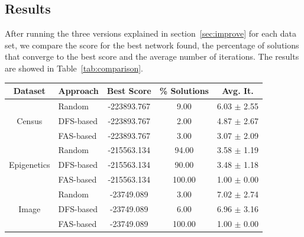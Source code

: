 \subsection{Results}
\label{subsec:results}
	After running the three versions explained in section~\ref{sec:improve} for each data set, we compare the score for the best network found, the percentage of solutions that converge to the best score and the average number of iterations. The results are showed in Table~\ref{tab:comparison}.

	\begin{table}[ h ]
		\centering
		\begin{tabular}{|c|l|c|c|c|}
			\hline
			Dataset & Approach & Best Score & \% Solutions & Avg. It. \\ \hline
			\multirow{3}{*}{Census} & Random & -223893.767 & 9.00 & 6.03 $\pm$ 2.55 \\ \cline{2-5} 
					& DFS-based & -223893.767 & 2.00 & 4.87 $\pm$ 2.67 \\ \cline{2-5}
					& FAS-based & -223893.767 & 3.00 & 3.07 $\pm$ 2.09 \\ \hline
			\multirow{3}{*}{Epigenetics} & Random & -215563.134 & 94.00 & 3.58 $\pm$ 1.19 \\ \cline{2-5} 
					& DFS-based & -215563.134 & 90.00 & 3.48 $\pm$ 1.18 \\ \cline{2-5}
					& FAS-based & -215563.134 & 100.00 & 1.00 $\pm$ 0.00 \\ \hline
			\multirow{3}{*}{Image} & Random & -23749.089 & 3.00 & 7.02 $\pm$ 2.74 \\ \cline{2-5} 
					& DFS-based & -23749.089 & 6.00 & 6.96 $\pm$ 3.16 \\ \cline{2-5}
					& FAS-based & -23749.089 & 100.00 & 1.00 $\pm$ 0.00 \\ \hline
			

\end{tabular}
\end{table}
